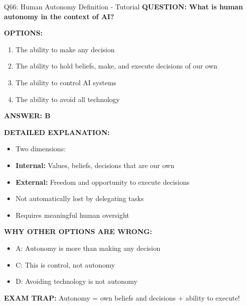 \documentclass[8pt]{beamer}
\begin{document}
	\begin{frame}{Q66: Human Autonomy Definition - Tutorial}
		\fontsize{6.5}{7.5}\selectfont
		\textbf{QUESTION: What is human autonomy in the context of AI?}
		
		\vspace{0.1cm}
		\textbf{OPTIONS:}
		\begin{enumerate}
			\item The ability to make any decision
			\item The ability to hold beliefs, make, and execute decisions of our own
			\item The ability to control AI systems
			\item The ability to avoid all technology
		\end{enumerate}
		
		\vspace{0.1cm}
		\textcolor{myblue}{\textbf{ANSWER: B}}
		
		\vspace{0.1cm}
		\textbf{DETAILED EXPLANATION:}
		\begin{itemize}
			\item Two dimensions:
			\item \textbf{Internal:} Values, beliefs, decisions that are our own
			\item \textbf{External:} Freedom and opportunity to execute decisions
			\item Not automatically lost by delegating tasks
			\item Requires meaningful human oversight
		\end{itemize}
		
		\vspace{0.1cm}
		\textcolor{myred}{\textbf{WHY OTHER OPTIONS ARE WRONG:}}
		\begin{itemize}
			\item \textcolor{myred}{A:} Autonomy is more than making any decision
			\item \textcolor{myred}{C:} This is control, not autonomy
			\item \textcolor{myred}{D:} Avoiding technology is not autonomy
		\end{itemize}
		
		\textcolor{myred}{\textbf{EXAM TRAP:}} Autonomy = \textcolor{myblue}{own beliefs and decisions + ability to execute}!
	\end{frame}
	
\end{document}
